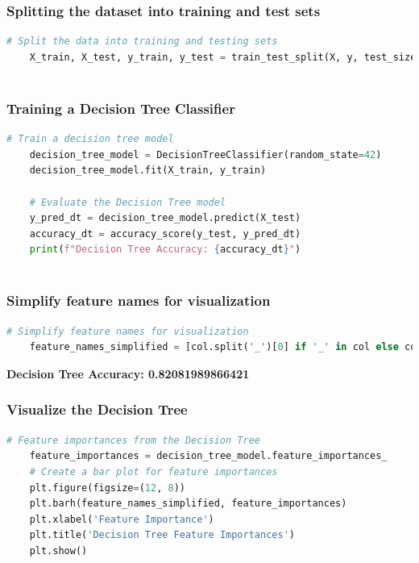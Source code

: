 \documentclass[10pt,journal,compsoc]{IEEEtran}
\begin{document}
\subsubsection{Splitting the dataset into training and test sets}
\begin{lstlisting}[language=Python, caption={Splitting the dataset into training and test sets}, label=python_code, captionpos=b,  basicstyle=\scriptsize]
    # Split the data into training and testing sets
    X_train, X_test, y_train, y_test = train_test_split(X, y, test_size=0.2, random_state=42)
  
\end{lstlisting}

\subsubsection{Training a Decision Tree Classifier}

\begin{lstlisting}[language=Python, caption={Training a Decision Tree Classifier}, label=python_code, captionpos=b,  basicstyle=\scriptsize]
    # Train a decision tree model
    decision_tree_model = DecisionTreeClassifier(random_state=42)
    decision_tree_model.fit(X_train, y_train)
    
    # Evaluate the Decision Tree model
    y_pred_dt = decision_tree_model.predict(X_test)
    accuracy_dt = accuracy_score(y_test, y_pred_dt)
    print(f"Decision Tree Accuracy: {accuracy_dt}")
    
\end{lstlisting}

\subsubsection{Simplify feature names for visualization}
\begin{lstlisting}[language=Python, captionpos=b,  basicstyle=\scriptsize]
    # Simplify feature names for visualization
    feature_names_simplified = [col.split('_')[0] if '_' in col else col for col in X.columns]
\end{lstlisting}

\textbf{Decision Tree Accuracy: 0.82081989866421}


\subsubsection{Visualize the Decision Tree}
\begin{lstlisting}[language=Python, caption={Visualize the Decision Tree}, label=python_code, captionpos=b,  basicstyle=\scriptsize]
    # Feature importances from the Decision Tree
    feature_importances = decision_tree_model.feature_importances_
    # Create a bar plot for feature importances
    plt.figure(figsize=(12, 8))
    plt.barh(feature_names_simplified, feature_importances)
    plt.xlabel('Feature Importance')
    plt.title('Decision Tree Feature Importances')
    plt.show()    
\end{lstlisting}
\end{document}
